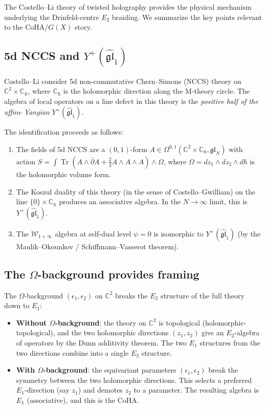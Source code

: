\documentclass[11pt]{article}
\theoremstyle{definition}
\theoremstyle{remark}
\newcommand{\CC}{\mathbb{C}}
\newcommand{\Tr}{\operatorname{Tr}}
\newcommand{\gl}{\mathfrak{gl}}
\begin{document}
The Costello--Li theory of twisted holography provides the
physical mechanism underlying the Drinfeld-centre $E_2$ braiding.
We summarize the key points relevant to the CoHA/$G(X)$ story.

\subsection{5d NCCS and $Y^+(\widehat{\gl}_1)$}

Costello--Li consider 5d non-commutative Chern--Simons (NCCS)
theory on $\CC^2 \times \CC_\hbar$, where $\CC_\hbar$ is the
holomorphic direction along the M-theory circle. The algebra
of local operators on a line defect in this theory is the
\emph{positive half of the affine Yangian}
$Y^+(\widehat{\gl}_1)$.

The identification proceeds as follows:
\begin{enumerate}[label=(\roman*)]
 \item The fields of 5d NCCS are a $(0,1)$-form
 $A \in \Omega^{0,1}(\CC^2 \times \CC_\hbar, \gl_N)$ with
 action $S = \int \Tr(A \wedge \bar\partial A +
 \tfrac{2}{3} A \wedge A \wedge A) \wedge \Omega$, where
 $\Omega = dz_1 \wedge dz_2 \wedge d\hbar$ is the
 holomorphic volume form.

 \item The Koszul duality of this theory (in the sense of
 Costello--Gwilliam) on the line $\{0\} \times \CC_\hbar$
 produces an associative algebra. In the $N \to \infty$ limit,
 this is $Y^+(\widehat{\gl}_1)$.

 \item The $\mathcal{W}_{1+\infty}$ algebra at self-dual level
 $\psi = 0$ is isomorphic to $Y^+(\widehat{\gl}_1)$ (by the
 Maulik--Okounkov / Schiffmann--Vasserot theorem).
\end{enumerate}

\subsection{The $\Omega$-background provides framing}

The $\Omega$-background $(\epsilon_1, \epsilon_2)$ on $\CC^2$
breaks the $E_2$ structure of the full theory down to $E_1$:

\begin{itemize}
 \item \textbf{Without $\Omega$-background}: the theory on
 $\CC^2$ is topological (holomorphic-topological), and the
 two holomorphic directions $(z_1, z_2)$ give an $E_2$-algebra
 of operators by the Dunn additivity theorem. The
 two $E_1$ structures from the two directions combine
 into a single $E_2$ structure.

 \item \textbf{With $\Omega$-background}: the equivariant
 parameters $(\epsilon_1, \epsilon_2)$ break the symmetry
 between the two holomorphic directions. This selects a
 preferred $E_1$-direction (say $z_1$) and demotes $z_2$ to
 a parameter. The resulting algebra is $E_1$ (associative),
 and this is the CoHA.
\end{itemize}
\end{document}
